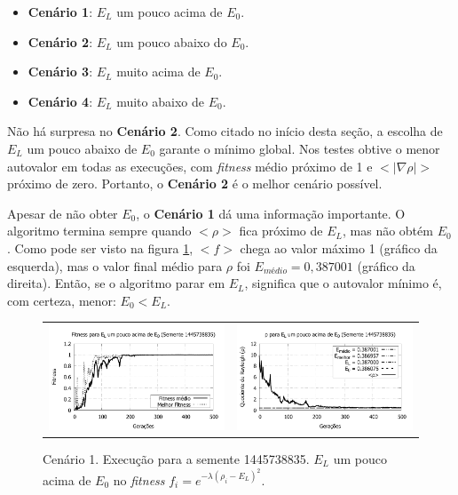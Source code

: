 	\begin{itemize}
	
		\item \textbf{Cenário 1}: $E_L$ um pouco acima de $E_0$.
			
		\item \textbf{Cenário 2}: $E_L$ um pouco abaixo do $E_0$.
		
		\item \textbf{Cenário 3}: $E_L$ muito acima de $E_0$.
		
		\item \textbf{Cenário 4}: $E_L$ muito abaixo de $E_0$.
	\end{itemize}
	
	
	Não há surpresa no \textbf{Cenário 2}. Como citado no início desta seção, a escolha de $E_L$ um pouco abaixo de $E_0$ garante o mínimo global. Nos testes obtive o menor autovalor em todas as execuções, com \emph{fitness} médio próximo de 1 e $<|\nabla \rho|>$ próximo de zero. Portanto, o \textbf{Cenário 2} é o melhor cenário possível.	
	
	Apesar de não obter $E_0$, o \textbf{Cenário 1} dá uma informação importante. O algoritmo termina sempre quando $<\rho>$ fica próximo de $E_L$, mas não obtém $E_0$. Como pode ser visto na figura \ref{fig:execucoesSemente_EL_umPoucoAcima}, $<f>$ chega ao valor máximo 1 (gráfico da esquerda), mas o valor final médio para $\rho$ foi $E_{médio} = 0,387001$ (gráfico da direita). Então, se o algoritmo parar em $E_L$, significa que o autovalor mínimo é, com certeza, menor: $E_0 < E_L$. 
	
	\begin{figure}[htbp]
	\centering
  \begin{tabular}{@{}cc@{}}
	
		\includegraphics[width=.45\textwidth]{figs/resultados/variandoELSemente/T1_S-1445738835_fitness.pdf} &
    \includegraphics[width=.45\textwidth]{figs/resultados/variandoELSemente/T1_S-1445738835_rho.pdf}
  \end{tabular}
  \caption{Cenário 1. Execução para a semente 1445738835. $E_L$ um pouco acima de $E_0$ no \textit{fitness} $f_i = e^{-\lambda(\rho_i - E_L)^2}$.}
	\label{fig:execucoesSemente_EL_umPoucoAcima}
	\end{figure}
	
